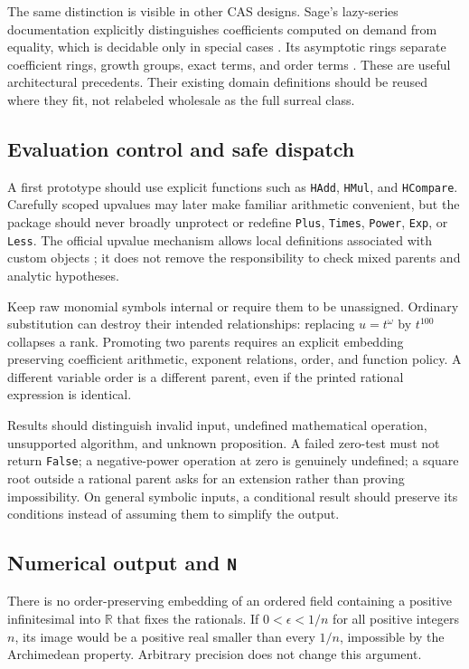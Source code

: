 \documentclass[11pt,letterpaper]{article}
\theoremstyle{definition}\newtheorem{definition}[theorem]{Definition}
\theoremstyle{remark}\newtheorem{remark}[theorem]{Remark}
\newcommand{\R}{\mathbb R}\newcommand{\C}{\mathbb C}
\newcommand{\code}[1]{\texttt{#1}}
\numberwithin{equation}{section}\setcounter{tocdepth}{2}
\begin{document}
The same distinction is visible in other CAS designs. Sage's lazy-series documentation explicitly distinguishes coefficients computed on demand from equality, which is decidable only in special cases \cite{SageLazy}. Its asymptotic rings separate coefficient rings, growth groups, exact terms, and order terms \cite{SageAsymptotic}. These are useful architectural precedents. Their existing domain definitions should be reused where they fit, not relabeled wholesale as the full surreal class.

\subsection{Evaluation control and safe dispatch}
A first prototype should use explicit functions such as \code{HAdd}, \code{HMul}, and \code{HCompare}. Carefully scoped upvalues may later make familiar arithmetic convenient, but the package should never broadly unprotect or redefine \code{Plus}, \code{Times}, \code{Power}, \code{Exp}, or \code{Less}. The official upvalue mechanism allows local definitions associated with custom objects \cite{WLUpValues}; it does not remove the responsibility to check mixed parents and analytic hypotheses.

Keep raw monomial symbols internal or require them to be unassigned. Ordinary substitution can destroy their intended relationships: replacing $u=t^\omega$ by $t^{100}$ collapses a rank. Promoting two parents requires an explicit embedding preserving coefficient arithmetic, exponent relations, order, and function policy. A different variable order is a different parent, even if the printed rational expression is identical.

Results should distinguish invalid input, undefined mathematical operation, unsupported algorithm, and unknown proposition. A failed zero-test must not return \code{False}; a negative-power operation at zero is genuinely undefined; a square root outside a rational parent asks for an extension rather than proving impossibility. On general symbolic inputs, a conditional result should preserve its conditions instead of assuming them to simplify the output.

\subsection{Numerical output and \code{N}}
There is no order-preserving embedding of an ordered field containing a positive infinitesimal into $\R$ that fixes the rationals. If $0<\epsilon<1/n$ for all positive integers $n$, its image would be a positive real smaller than every $1/n$, impossible by the Archimedean property. Arbitrary precision does not change this argument.
\end{document}

